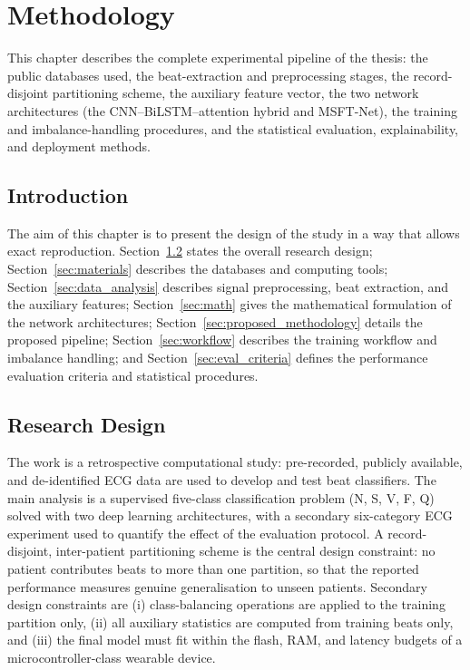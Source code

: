 %

\chapter{Methodology}
\label{ch:methodology}

This chapter describes the complete experimental pipeline of the thesis: the
public databases used, the beat-extraction and preprocessing stages, the
record-disjoint partitioning scheme, the auxiliary feature vector, the two
network architectures (the CNN--BiLSTM--attention hybrid and MSFT-Net), the
training and imbalance-handling procedures, and the statistical evaluation,
explainability, and deployment methods.


\section{Introduction}
\label{sec:ch2_intro}

The aim of this chapter is to present the design of the study in a way that
allows exact reproduction. Section~\ref{sec:design} states the overall
research design; Section~\ref{sec:materials} describes the databases and
computing tools; Section~\ref{sec:data_analysis} describes signal
preprocessing, beat extraction, and the auxiliary features;
Section~\ref{sec:math} gives the mathematical formulation of the network
architectures; Section~\ref{sec:proposed_methodology} details the proposed
pipeline; Section~\ref{sec:workflow} describes the training workflow and
imbalance handling; and Section~\ref{sec:eval_criteria} defines the
performance evaluation criteria and statistical procedures.


\section{Research Design}
\label{sec:design}

The work is a retrospective computational study: pre-recorded, publicly
available, and de-identified ECG data are used to develop and test beat
classifiers. The main analysis is a supervised five-class classification
problem (N, S, V, F, Q) solved with two deep learning architectures, with a
secondary six-category ECG experiment used to quantify the effect of the
evaluation protocol. A record-disjoint, inter-patient partitioning scheme is
the central design constraint: no patient contributes beats to more than one
partition, so that the reported performance measures genuine generalisation
to unseen patients. Secondary design constraints are (i) class-balancing
operations are applied to the training partition only, (ii) all auxiliary
statistics are computed from training beats only, and (iii) the final model
must fit within the flash, RAM, and latency budgets of a
microcontroller-class wearable device.


